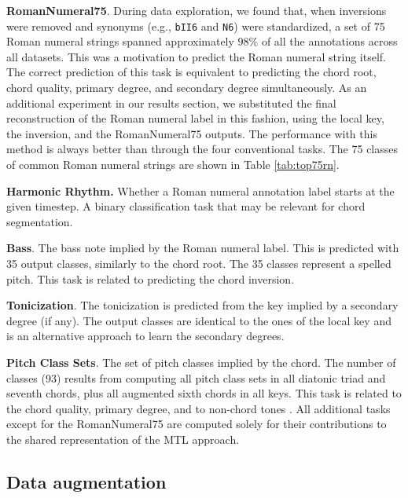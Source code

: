 \documentclass{article}
\begin{document}
\textbf{RomanNumeral75}. During data exploration, we found that, when inversions were removed and synonyms (e.g., \texttt{bII6} and \texttt{N6}) were standardized, a set of 75 Roman numeral strings spanned approximately $98\%$ of all the annotations across all datasets. This was a motivation to predict the Roman numeral string itself. The correct prediction of this task is equivalent to predicting the chord root, chord quality, primary degree, and secondary degree simultaneously. As an additional experiment in our results section, we substituted the final reconstruction of the Roman numeral label in this fashion, using the local key, the inversion, and the RomanNumeral75 outputs. The performance with this method is always better than through the four conventional tasks. The 75 classes of common Roman numeral strings are shown in Table \ref{tab:top75rn}. 


\textbf{Harmonic Rhythm.} Whether a Roman numeral annotation label starts at the given timestep. A binary classification task that may be relevant for chord segmentation.

\textbf{Bass}. The bass note implied by the Roman numeral label. This is predicted with 35 output classes, similarly to the chord root. The 35 classes represent a spelled pitch. This task is related to predicting the chord inversion.

\textbf{Tonicization}. The tonicization is predicted from the key implied by a secondary degree (if any). 
The output classes are identical to the ones of the local key and is an alternative approach to learn the secondary degrees.

\textbf{Pitch Class Sets}. The set of pitch classes implied by the chord. The number of classes (93) results from computing all pitch class sets in all diatonic triad and seventh chords, plus all augmented sixth chords in all keys. This task is related to the chord quality, primary degree, and to non-chord tones \cite{ju2017nonchord}.
All additional tasks except for the RomanNumeral75 are computed solely for their contributions to the shared representation of the MTL approach.

\subsection{Data augmentation}
\end{document}
